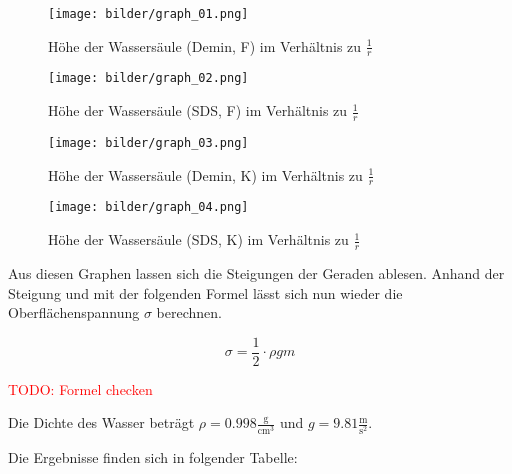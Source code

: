             \begin{figure}[H]
                \centering
                \caption{Höhe der Wassersäule (Demin, F) im Verhältnis zu $\frac{1}{r}$}
                \texttt{[image: bilder/graph\_01.png]}
                \label{fig:Versuch3_Graph1}
            \end{figure}

            \begin{figure}[H]
                \centering
                \caption{Höhe der Wassersäule (SDS, F) im Verhältnis zu $\frac{1}{r}$}
                \texttt{[image: bilder/graph\_02.png]}
                \label{fig:Versuch3_Graph2}
            \end{figure}

            \begin{figure}[H]
                \centering
                \caption{Höhe der Wassersäule (Demin, K) im Verhältnis zu $\frac{1}{r}$}
                \texttt{[image: bilder/graph\_03.png]}
                \label{fig:Versuch3_Graph3}
            \end{figure}

            \begin{figure}[H]
                \centering
                \caption{Höhe der Wassersäule (SDS, K) im Verhältnis zu $\frac{1}{r}$}
                \texttt{[image: bilder/graph\_04.png]}
                \label{fig:Versuch3_Graph4}
            \end{figure}

            Aus diesen Graphen lassen sich die Steigungen der Geraden ablesen. Anhand der Steigung und mit der folgenden Formel lässt sich nun wieder die Oberflächenspannung $\sigma$ berechnen.

            \begin{equation}
                \sigma = \frac{1}{2} \cdot \rho g m
                \label{eq:Oberflächenspannung_Kapillarmethode}
            \end{equation}

            \textcolor{red}{TODO: Formel checken}

            Die Dichte des Wasser beträgt $\rho = 0.998 \frac{\mathrm{g}}{\mathrm{cm^3}}$ und $g = 9.81 \frac{\mathrm{m}}{\mathrm{s^2}}$.

            Die Ergebnisse finden sich in folgender Tabelle:

